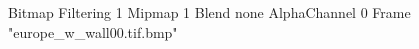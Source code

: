 {Bitmap
	{Filtering 1}
	{Mipmap 1}
	{Blend none}
	{AlphaChannel 0}
	{Frame "europe_w_wall00.tif.bmp"}
}
